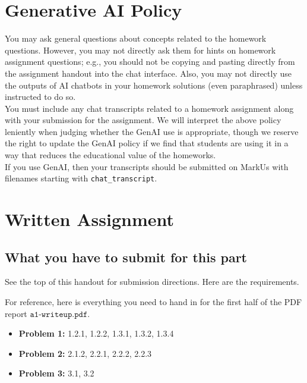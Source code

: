 \documentclass[11pt]{article}
\newcommand{\writeupFile}{\texttt{a1-writeup.pdf}}
\begin{document}
\section*{Generative AI Policy}
You may ask general questions about concepts related to the homework questions. However, you may not directly ask them for hints on homework assignment questions; e.g., you should not be copying and pasting directly from the assignment handout into the chat interface. Also, you may not directly use the outputs of AI chatbots in your homework solutions (even paraphrased) unless instructed to do so.\\

\noindent You must include any chat transcripts related to a homework assignment along with your submission for the assignment. We will interpret the above policy leniently when judging whether the GenAI use is appropriate, though we reserve the right to update the GenAI policy if we find that students are using it in a way that reduces the educational value of the homeworks. \\

\noindent If you use GenAI, then your transcripts should be submitted on MarkUs with filenames starting with \texttt{chat\_transcript}.


\pagebreak

\section*{Written Assignment}

\subsection*{What you have to submit for this part}

See the top of this handout for submission directions. Here are the requirements. 

For reference, here is everything you need to hand in for the first half of the PDF report $\writeupFile$. 

\begin{itemize}
    \item \textbf{Problem 1:} 1.2.1, 1.2.2, 1.3.1, 1.3.2, 1.3.4
    \item \textbf{Problem 2:} 2.1.2, 2.2.1, 2.2.2, 2.2.3
    \item \textbf{Problem 3:} 3.1, 3.2
\end{itemize}

\bigskip
\end{document}
